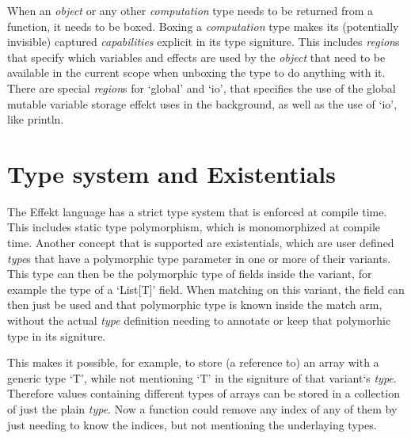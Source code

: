When an \textit{object} or any other \textit{computation} type needs to be returned from a function, it needs to be boxed. Boxing a \textit{computation} type makes its (potentially invisible) captured \textit{capabilities} explicit in its type signiture. This includes \textit{region}s that specify which variables and effects are used by the \textit{object} that need to be available in the current scope when unboxing the type to do anything with it. There are special \textit{region}s for `global' and `io', that specifies the use of the global mutable variable storage effekt uses in the background, as well as the use of `io', like println.

\section{Type system and Existentials}

The Effekt language has a strict type system that is enforced at compile time. This includes static type polymorphism, which is monomorphized at compile time. Another concept that is supported are existentials, which are user defined \textit{type}s that have a polymorphic type parameter in one or more of their variants. This type can then be the polymorphic type of fields inside the variant, for example the type of a `List[T]' field. When matching on this variant, the field can then just be used and that polymorphic type is known inside the match arm, without the actual \textit{type} definition needing to annotate or keep that polymorhic type in its signiture.

This makes it possible, for example, to store (a reference to) an array with a generic type `T', while not mentioning `T' in the signiture of that variant`s \textit{type}. Therefore values containing different types of arrays can be stored in a collection of just the plain \textit{type}. Now a function could remove any index of any of them by just needing to know the indices, but not mentioning the underlaying types.
